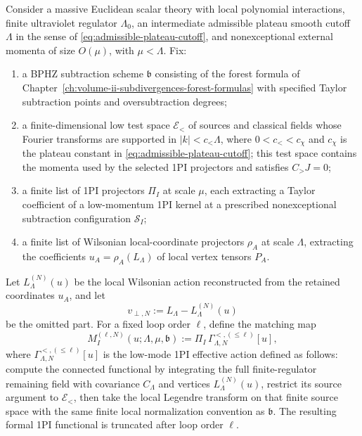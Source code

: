 \begin{definition}
\label{def:finite-order-bphz-wilsonian-matching-context}
Consider a massive Euclidean scalar theory with local polynomial
interactions, finite ultraviolet regulator \(\Lambda_0\), an intermediate
admissible plateau smooth cutoff \(\Lambda\) in the sense of
\eqref{eq:admissible-plateau-cutoff}, and nonexceptional external momenta of
size \(O(\mu)\), with \(\mu<\Lambda\).  Fix:
\begin{enumerate}[label=(\roman*)]
  \item a BPHZ subtraction scheme \(\mathfrak b\) consisting of the forest
  formula of Chapter~\ref{ch:volume-ii-subdivergences-forest-formulas} with specified
  Taylor subtraction points and oversubtraction degrees;
  \item a finite-dimensional low test space \(\mathcal E_<\) of sources and
  classical fields whose Fourier transforms are supported in
  \(|k|<c_<\Lambda\), where \(0<c_< < c_\chi\) and \(c_\chi\) is the plateau
  constant in \eqref{eq:admissible-plateau-cutoff}; this test space contains
  the momenta used by the selected 1PI projectors and satisfies \(C_>J=0\);
  \item a finite list of 1PI projectors \(\Pi_I\) at scale \(\mu\), each
  extracting a Taylor coefficient of a low-momentum 1PI kernel at a prescribed
  nonexceptional subtraction configuration \(\mathcal S_I\);
  \item a finite list of Wilsonian local-coordinate projectors \(\rho_A\) at
  scale \(\Lambda\), extracting the coefficients \(u_A=\rho_A(L_\Lambda)\) of
  local vertex tensors \(P_A\).
\end{enumerate}
Let \(L_\Lambda^{(N)}(u)\) be the local Wilsonian action reconstructed from
the retained coordinates \(u_A\), and let
\[
  v_{\perp,N}:=L_\Lambda-L_\Lambda^{(N)}(u)
\]
be the omitted part.  For a fixed loop order \(\ell\), define the matching
map
\begin{equation}
  M_I^{(\ell,N)}(u;\Lambda,\mu,\mathfrak b)
  :=
  \Pi_I\,
  \Gamma^{<,(\leq\ell)}_{\Lambda,N}[u],
  \label{eq:finite-order-bphz-wilsonian-matching-map}
\end{equation}
where \(\Gamma^{<,(\leq\ell)}_{\Lambda,N}[u]\) is the low-mode 1PI effective
action defined as follows: compute the connected functional by integrating
the full finite-regulator remaining field with covariance \(C_\Lambda\) and
vertices \(L_\Lambda^{(N)}(u)\), restrict its source argument to
\(\mathcal E_<\), then take the local Legendre transform on that finite
source space with the same finite local normalization convention as
\(\mathfrak b\).  The resulting formal 1PI functional is truncated after loop
order \(\ell\).
\end{definition}

